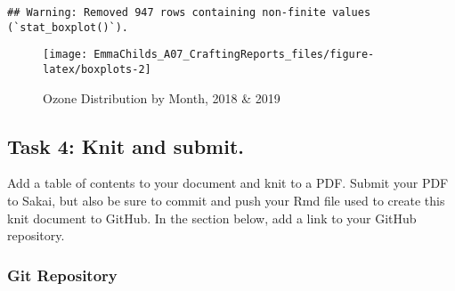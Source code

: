 \documentclass[
]{article}
\begin{document}
\begin{verbatim}
## Warning: Removed 947 rows containing non-finite values (`stat_boxplot()`).
\end{verbatim}

\begin{figure}

\texttt{[image: EmmaChilds\_A07\_CraftingReports\_files/figure-latex/boxplots-2]} \hfill{}

\caption{Ozone Distribution by Month, 2018 & 2019}\label{fig:boxplots-2}
\end{figure}

\hypertarget{task-4-knit-and-submit.}{%
\subsection{Task 4: Knit and submit.}\label{task-4-knit-and-submit.}}

Add a table of contents to your document and knit to a PDF. Submit your
PDF to Sakai, but also be sure to commit and push your Rmd file used to
create this knit document to GitHub. In the section below, add a link to
your GitHub repository.

\hypertarget{git-repository}{%
\subsubsection{Git Repository}\label{git-repository}}
\end{document}
